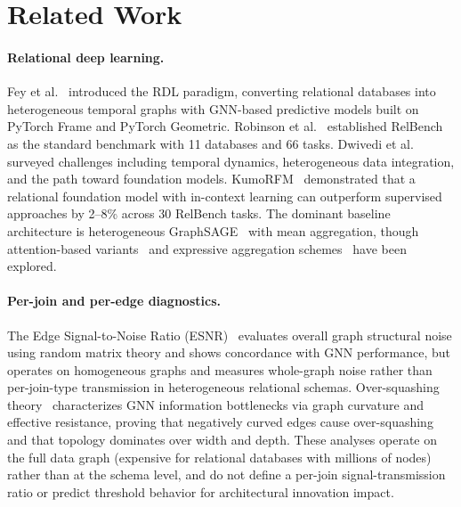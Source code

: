 \documentclass[11pt,letterpaper]{article}
\begin{document}
\section{Related Work}
\label{sec:related}

\paragraph{Relational deep learning.}
Fey et al.~\citep{Fey2023} introduced the RDL paradigm, converting relational databases into heterogeneous temporal graphs with GNN-based predictive models built on PyTorch Frame and PyTorch Geometric. Robinson et al.~\citep{Robinson2024} established RelBench as the standard benchmark with 11 databases and 66 tasks. Dwivedi et al.~\citep{Dwivedi2025} surveyed challenges including temporal dynamics, heterogeneous data integration, and the path toward foundation models. KumoRFM~\citep{Fey2025} demonstrated that a relational foundation model with in-context learning can outperform supervised approaches by 2--8\% across 30 RelBench tasks. The dominant baseline architecture is heterogeneous GraphSAGE~\citep{Hamilton2017} with mean aggregation, though attention-based variants~\citep{Velickovic2018, Hu2020} and expressive aggregation schemes~\citep{Xu2019, Corso2020} have been explored.

\paragraph{Per-join and per-edge diagnostics.}
The Edge Signal-to-Noise Ratio (ESNR)~\citep{Dong2023} evaluates overall graph structural noise using random matrix theory and shows concordance with GNN performance, but operates on homogeneous graphs and measures whole-graph noise rather than per-join-type transmission in heterogeneous relational schemas. Over-squashing theory~\citep{Topping2022, DiGiovanni2023} characterizes GNN information bottlenecks via graph curvature and effective resistance, proving that negatively curved edges cause over-squashing and that topology dominates over width and depth. These analyses operate on the full data graph (expensive for relational databases with millions of nodes) rather than at the schema level, and do not define a per-join signal-transmission ratio or predict threshold behavior for architectural innovation impact.
\end{document}

